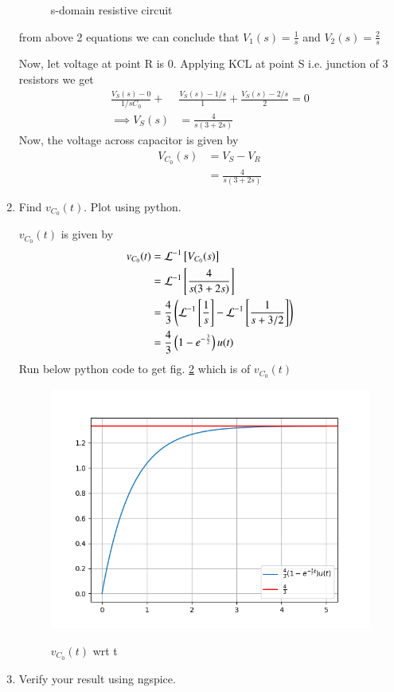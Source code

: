 \documentclass[journal,12pt,twocolumn]{IEEEtran}
\renewcommand\thesection{\arabic{section}}
\begin{document}
\begin{enumerate}[label=\arabic*.,ref=\thesection.\theenumi]
		\solution


\begin{figure}[!ht]
	
	\centering
	\caption{s-domain resistive circuit}
	\label{crct:2.6}
\end{figure}
		from above 2 equations we can conclude that $V_1(s)=\frac{1}{s}$ and $V_2(s)=\frac{2}{s}$

		Now, let voltage at point R is 0. Applying KCL at point S i.e. junction of 3 resistors we get
		\begin{align}
			\frac{V_S(s)-0}{1/sC_0}+&\frac{V_S(s)-1/s}{1}+\frac{V_S(s)-2/s}{2}=0\\
		\implies	V_S(s)&=\frac{4}{s(3+2s)}
		\end{align}
		Now, the voltage across capacitor is given by
		\begin{align}
			V_{C_0}(s)&=V_S-V_R\\
			&=\frac{4}{s(3+2s)}
		\end{align}
	\item Find $v_{C_0}(t)$.  Plot using python.

		\solution $v_{C_0}(t)$ is given by
			\begin{align}
				v_{C_0}(t)&=\mathcal{L}^{-1}{}\left[V_{C_0}(s)\right]\\
				&=\mathcal{L}^{-1}{}\left[\frac{4}{s(3+2s)}\right]\\
				&=\frac{4}{3}\left(\mathcal{L}^{-1}{}\left[\frac{1}{s}\right]-\mathcal{L}^{-1}{}\left[\frac{1}{s+3/2}\right]\right)\\
				&=\frac{4}{3}\left(1-e^{-\frac{3}{2}}\right)u(t)
				\end{align}
Run below python code to get fig. \ref{fig:v_t_1} which is of $v_{C_0}(t)$

\begin{figure}[!ht]
	\centering
	\includegraphics[width=\columnwidth]{./ques_2/v_t_1.png}
\label{fig:v_t_1}
\caption{$v_{C_0}(t)$ wrt t}	
\end{figure}
	\item Verify your result using ngspice.


\end{enumerate}
\end{document}
